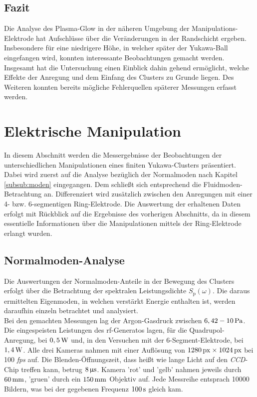 \documentclass[numbers=noenddot,a4paper,notitlepage,twoside,BCOR15mm]{scrbook}
\newcommand{\ix}[1]{_\text{#1}}
\newcommand{\tilt}[1]{\textit{#1}}
\begin{document}
				\subsection*{Fazit}

						Die Analyse des Plasma-Glow in der näheren Umgebung der Manipulations-Elektrode hat Aufschlüsse über die Veränderungen in der Randschicht ergeben. Insbesondere für eine niedrigere Höhe, in welcher später der Yukawa-Ball eingefangen wird, konnten interessante Beobachtungen gemacht werden. Insgesamt hat die Untersuchung einen Einblick dahin gehend ermöglicht, welche Effekte der Anregung und dem Einfang des Clusters zu Grunde liegen. Des Weiteren konnten bereits mögliche Fehlerquellen späterer Messungen erfasst werden.

			\newpage

		\section{Elektrische Manipulation}

			In diesem Abschnitt werden die Messergebnisse der Beobachtungen der unterschiedlichen Manipulationen eines finiten Yukawa-Clusters präsentiert. Dabei wird zuerst auf die Analyse bezüglich der Normalmoden nach Kapitel \ref{subsub:moden} eingegangen. Dem schließt sich entsprechend die Fluidmoden-Betrachtung an. Differenziert wird zusätzlich zwischen den Anregungen mit einer 4- bzw. 6-segmentigen Ring-Elektrode. Die Auswertung der erhaltenen Daten erfolgt mit Rückblick auf die Ergebnisse des vorherigen Abschnitts, da in diesem essentielle Informationen über die Manipulationen mittels der Ring-Elektrode erlangt wurden.

			\subsection{Normalmoden-Analyse}

				Die Auswertungen der Normalmoden-Anteile in der Bewegung des Clusters erfolgt über die Betrachtung der spektralen Leistungsdichte $S\ix{p}\left(\omega\right)$. Die daraus ermittelten Eigenmoden, in welchen verstärkt Energie enthalten ist, werden daraufhin einzeln betrachtet und analysiert.\\
				Bei den gemachten Messungen lag der Argon-Gasdruck zwischen $\unit[6,42-10]{Pa}$. Die eingespeisten Leistungen des rf-Generatos lagen, für die Quadrupol-Anregung, bei $\unit[0,5]{W}$ und, in den Versuchen mit der 6-Segment-Elektrode, bei $\unit[1,4]{W}$. Alle drei Kameras nahmen mit einer Auflösung von $\unit[1280]{px}\times\unit[1024]{px}$ bei 100 \tilt{fps} auf. Die Blenden-Öffnungszeit, dass heißt wie lange Licht auf den \tilt{CCD}-Chip treffen kann, betrug $\unit[8]{\upmu s}$. Kamera 'rot' und 'gelb' nahmen jeweils durch $\unit[60]{mm}$, 'gruen' durch ein $\unit[150]{mm}$ Objektiv auf. Jede Messreihe entsprach 10000 Bildern, was bei der gegebenen Frequenz $\unit[100]{s}$ gleich kam.
\end{document}
